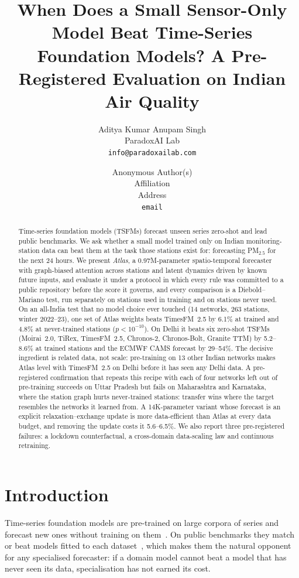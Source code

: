 \documentclass{article}
\title{When Does a Small Sensor-Only Model Beat Time-Series Foundation Models? A Pre-Registered Evaluation on Indian Air Quality}
\author{%
  Aditya Kumar \qquad Anupam Singh\\
  ParadoxAI Lab\\
  \texttt{info@paradoxailab.com}
}
\author{Anonymous Author(s)\\Affiliation\\Address\\\texttt{email}}
\newcommand{\pmtf}{PM$_{2.5}$}
\begin{document}
\maketitle

\begin{abstract}
Time-series foundation models (TSFMs) forecast unseen series zero-shot and lead public benchmarks. We ask whether a
small model trained only on Indian monitoring-station data can beat them at the task those stations exist for:
forecasting \pmtf{} for the next 24 hours. We present \emph{Atlas}, a 0.97M-parameter spatio-temporal forecaster with
graph-biased attention across stations and latent dynamics driven by known future inputs, and evaluate it under a
protocol in which every rule was committed to a public repository before the score it governs, and every comparison
is a Diebold--Mariano test, run separately on stations used in training and on stations never used. On an all-India
test that no model choice ever touched (14 networks, 263 stations, winter 2022--23), one set of Atlas weights beats
TimesFM~2.5 by 6.1\% at trained and 4.8\% at never-trained stations ($p<10^{-10}$). On Delhi it beats six zero-shot
TSFMs (Moirai~2.0, TiRex, TimesFM~2.5, Chronos-2, Chronos-Bolt, Granite TTM) by 5.2--8.6\% at trained stations
and the ECMWF CAMS forecast by 29--54\%. The decisive ingredient is related data, not scale: pre-training on 13 other Indian networks
makes Atlas level with TimesFM~2.5 on Delhi before it has seen any Delhi data. A pre-registered confirmation that
repeats this recipe with each of four networks left out of pre-training succeeds on Uttar Pradesh but fails on
Maharashtra and Karnataka, where the station graph hurts never-trained stations: transfer wins where the target
resembles the networks it learned from. A 14K-parameter variant whose forecast
is an explicit relaxation--exchange update is more data-efficient than Atlas at every data budget, and removing the
update costs it 5.6--6.5\%. We also report three pre-registered failures: a lockdown counterfactual, a cross-domain
data-scaling law and continuous retraining.
\end{abstract}

\section{Introduction}
\label{sec:intro}

Time-series foundation models are pre-trained on large corpora of series and forecast new ones without training on
them~\citep{das2024timesfm,ansari2024chronos,woo2024moirai,ekambaram2024ttm}. On public benchmarks they match or beat
models fitted to each dataset~\citep{aksu2024gifteval}, which makes them the natural opponent for any specialised
forecaster: if a domain model cannot beat a model that has never seen its data, specialisation has not earned its
cost.
\end{document}
